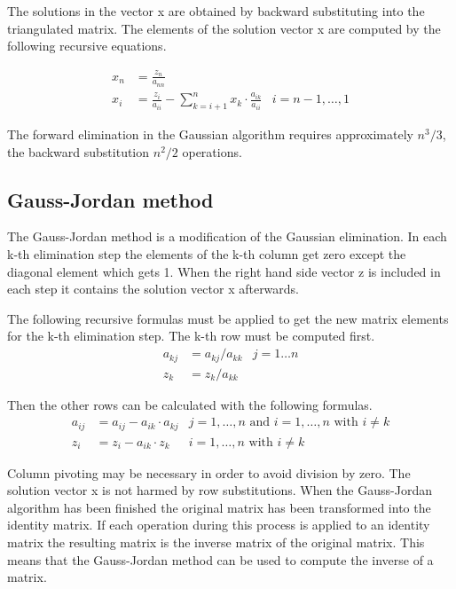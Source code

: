 \documentclass[10pt]{report}
\begin{document}
The solutions in the vector x are obtained by backward substituting
into the triangulated matrix.  The elements of the solution vector x
are computed by the following recursive equations.

\begin{align}
x_{n} &= \frac{z_{n}}{a_{nn}}\\
x_{i} &= \frac{z_{i}}{a_{ii}} - \sum_{k=i+1}^{n} x_{k}\cdot \frac{a_{ik}}{a_{ii}} & i = n - 1,\ldots,1
\end{align}

The forward elimination in the Gaussian algorithm requires
approximately $n^3/3$, the backward substitution $n^2/2$ operations.

\subsection{Gauss-Jordan method}

The Gauss-Jordan method is a modification of the Gaussian elimination.
In each k-th elimination step the elements of the k-th column get zero
except the diagonal element which gets 1.  When the right hand side
vector z is included in each step it contains the solution vector x
afterwards.

\addvspace{12pt}

The following recursive formulas must be applied to get the new matrix
elements for the k-th elimination step.  The k-th row must be computed
first.
\begin{align}
a_{kj} &= a_{kj} / a_{kk} & j = 1\ldots n\\
z_{k}  &= z_{k} / a_{kk}  &
\end{align}

Then the other rows can be calculated with the following formulas.
\begin{align}
a_{ij} &= a_{ij} - a_{ik}\cdot a_{kj} & j = 1,\ldots,n \textrm{ and } i = 1,\ldots,n \textrm{ with } i \ne k\\
z_{i}  &= z_{i} - a_{ik}\cdot z_{k}   & i = 1,\ldots,n \textrm{ with } i \ne k
\end{align}

Column pivoting may be necessary in order to avoid division by zero.
The solution vector x is not harmed by row substitutions.  When the
Gauss-Jordan algorithm has been finished the original matrix has been
transformed into the identity matrix.  If each operation during this
process is applied to an identity matrix the resulting matrix is the
inverse matrix of the original matrix.  This means that the
Gauss-Jordan method can be used to compute the inverse of a matrix.
\end{document}
